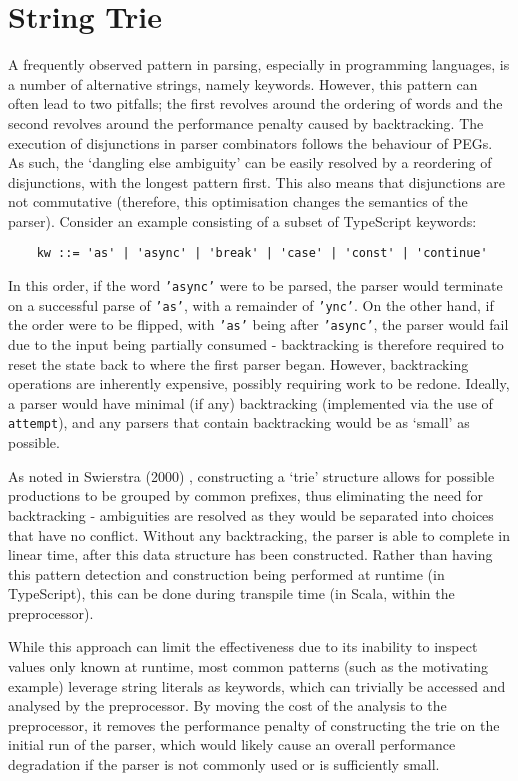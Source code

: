 \section{String Trie}
\label{sec:str_trie}

A frequently observed pattern in parsing, especially in programming languages, is a number of alternative strings, namely keywords.
However, this pattern can often lead to two pitfalls; the first revolves around the ordering of words and the second revolves around the performance penalty caused by backtracking.
The execution of disjunctions in parser combinators follows the behaviour of PEGs.
As such, the `dangling else ambiguity' can be easily resolved by a reordering of disjunctions, with the longest pattern first.
This also means that disjunctions are not commutative (therefore, this optimisation changes the semantics of the parser).
Consider an example consisting of a subset of TypeScript keywords:

\begin{lstlisting}
    kw ::= 'as' | 'async' | 'break' | 'case' | 'const' | 'continue'
\end{lstlisting}

In this order, if the word \texttt{'async'} were to be parsed, the parser would terminate on a successful parse of \texttt{'as'}, with a remainder of \texttt{'ync'}.
On the other hand, if the order were to be flipped, with \texttt{'as'} being after \texttt{'async'}, the parser would fail due to the input being partially consumed - backtracking is therefore required to reset the state back to where the first parser began.
However, backtracking operations are inherently expensive, possibly requiring work to be redone.
Ideally, a parser would have minimal (if any) backtracking (implemented via the use of \texttt{attempt}), and any parsers that contain backtracking would be as `small' as possible.

As noted in Swierstra (2000) \cite{swierstra00}, constructing a `trie' structure allows for possible productions to be grouped by common prefixes, thus eliminating the need for backtracking - ambiguities are resolved as they would be separated into choices that have no conflict.
Without any backtracking, the parser is able to complete in linear time, after this data structure has been constructed.
Rather than having this pattern detection and construction being performed at runtime (in TypeScript), this can be done during transpile time (in Scala, within the preprocessor).

While this approach can limit the effectiveness due to its inability to inspect values only known at runtime, most common patterns (such as the motivating example) leverage string literals as keywords, which can trivially be accessed and analysed by the preprocessor.
By moving the cost of the analysis to the preprocessor, it removes the performance penalty of constructing the trie on the initial run of the parser, which would likely cause an overall performance degradation if the parser is not commonly used or is sufficiently small.

